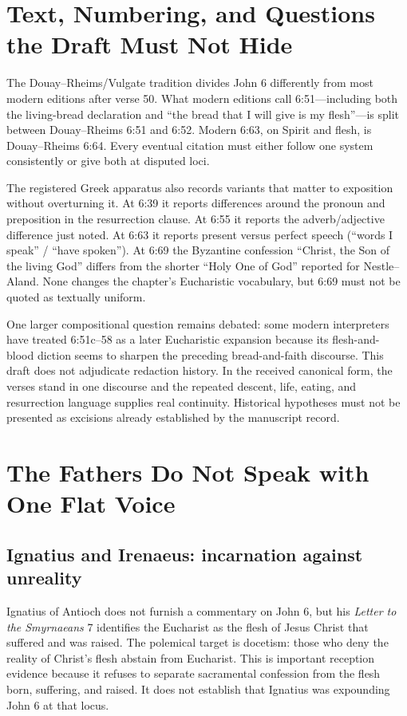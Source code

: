 \begin{deepstudy}
\section{Text, Numbering, and Questions the Draft Must Not Hide}

The Douay--Rheims/Vulgate tradition divides John 6 differently from most modern
editions after verse 50. What modern editions call 6:51---including both the
living-bread declaration and ``the bread that I will give is my flesh''---is
split between Douay--Rheims 6:51 and 6:52. Modern 6:63, on Spirit and flesh, is
Douay--Rheims 6:64. Every eventual citation must either follow one system
consistently or give both at disputed loci.

The registered Greek apparatus also records variants that matter to exposition
without overturning it. At 6:39 it reports differences around the pronoun and
preposition in the resurrection clause. At 6:55 it reports the adverb/adjective
difference just noted. At 6:63 it reports present versus perfect speech
(``words I speak'' / ``have spoken''). At 6:69 the Byzantine confession
``Christ, the Son of the living God'' differs from the shorter ``Holy One of
God'' reported for Nestle--Aland. None changes the chapter's Eucharistic
vocabulary, but 6:69 must not be quoted as textually uniform.

One larger compositional question remains debated: some modern interpreters
have treated 6:51c--58 as a later Eucharistic expansion because its flesh-and-
blood diction seems to sharpen the preceding bread-and-faith discourse. This
draft does not adjudicate redaction history. In the received canonical form,
the verses stand in one discourse and the repeated descent, life, eating, and
resurrection language supplies real continuity. Historical hypotheses must not
be presented as excisions already established by the manuscript record.

\section{The Fathers Do Not Speak with One Flat Voice}

\subsection{Ignatius and Irenaeus: incarnation against unreality}

Ignatius of Antioch does not furnish a commentary on John 6, but his
\emph{Letter to the Smyrnaeans} 7 identifies the Eucharist as the flesh of
Jesus Christ that suffered and was raised. The polemical target is docetism:
those who deny the reality of Christ's flesh abstain from Eucharist. This is
important reception evidence because it refuses to separate sacramental
confession from the flesh born, suffering, and raised. It does not establish
that Ignatius was expounding John 6 at that locus.


\end{deepstudy}
